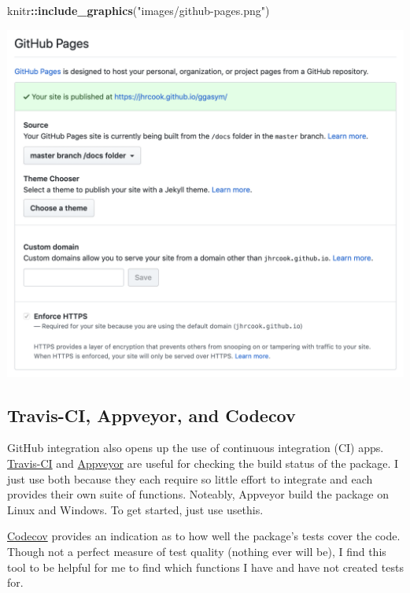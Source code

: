 \documentclass[]{book}
\newenvironment{Shaded}{\begin{snugshade}}{\end{snugshade}}
\newcommand{\KeywordTok}[1]{\textcolor[rgb]{0.13,0.29,0.53}{\textbf{#1}}}
\newcommand{\NormalTok}[1]{#1}
\newcommand{\OperatorTok}[1]{\textcolor[rgb]{0.81,0.36,0.00}{\textbf{#1}}}
\newcommand{\StringTok}[1]{\textcolor[rgb]{0.31,0.60,0.02}{#1}}
\begin{document}
\begin{Shaded}
\begin{Highlighting}[]
\NormalTok{knitr}\OperatorTok{::}\KeywordTok{include_graphics}\NormalTok{(}\StringTok{"images/github-pages.png"}\NormalTok{)}
\end{Highlighting}
\end{Shaded}

\includegraphics[width=20.97in]{images/github-pages}

\hypertarget{travis-ci-appveyor-and-codecov}{%
\subsection{Travis-CI, Appveyor, and Codecov}\label{travis-ci-appveyor-and-codecov}}

GitHub integration also opens up the use of continuous integration (CI) apps. \href{https://travis-ci.org}{Travis-CI} and \href{https://www.appveyor.com}{Appveyor} are useful for checking the build status of the package. I just use both because they each require so little effort to integrate and each provides their own suite of functions. Noteably, Appveyor build the package on Linux and Windows. To get started, just use usethis.

\href{https://codecov.io}{Codecov} provides an indication as to how well the package's tests cover the code. Though not a perfect measure of test quality (nothing ever will be), I find this tool to be helpful for me to find which functions I have and have not created tests for.
\end{document}
